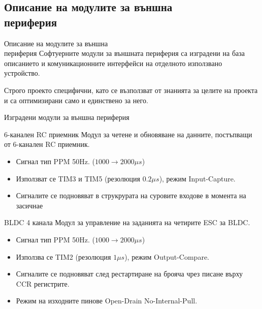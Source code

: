 \documentclass{beamer}
\begin{document}
\subsection{Описание на модулите за външна\\периферия}

\begin{frame}{Описание на модулите за външна\\периферия}
	\pause
	Софтуерните модули за външната периферия са изградени на база описанието и комуникационните интерфейси на отделното използвано устройство.
	
	\pause
	Строго проекто специфични, като се възползват от знанията за целите на проекта и са оптимизирани само и единствено за него.

\end{frame}

\begin{frame}{Изградени модули за външна периферия}
	\pause
	\begin{block}{6-канален RC приемник}
		\pause
		Модул за четене и обновяване на данните, постъпващи от 6-канален RC приемник.
		\begin{itemize}
			\pause
			\item Сигнал тип PPM 50Hz. (\(1000\to2000\mu s\))
			\pause
			\item Използват се TIM3 и TIM5 (резолюция \(0.2\mu s\)), режим Input-Capture.
			\pause
			\item Сигналите се подновяват в струкрурата на суровите входове в момента на засичнае
		\end{itemize}
	\end{block}

\end{frame}


\begin{frame}[t]
	\pause
	\begin{block}{BLDC 4 канала}
		\pause
		Модул за управление на заданията на четирите ESC за BLDC.
		\begin{itemize}
			\pause
			\item Сигнал тип PPM 50Hz. (\(1000\to2000\mu s\))
			\pause
			\item Използва се TIM2 (резолюция \(1\mu s\)), режим Output-Compare.
			\pause
			\item Сигналите се подновяват след рестартиране на брояча чрез писане върху CCR регистрите.
			\pause
			\item Режим на изходните пинове Open-Drain No-Internal-Pull.
		\end{itemize}
	\end{block}
\end{frame}
\end{document}
